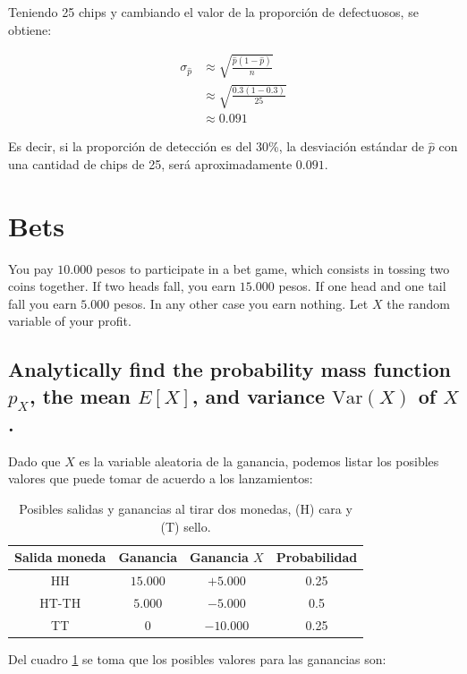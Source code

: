 \documentclass[12pt]{article}\usepackage[]{graphicx}\usepackage[]{xcolor}
\begin{document}
Teniendo 25 chips y cambiando el valor de la proporción de defectuosos, se obtiene:

\begin{align*}
  \sigma_{\hat{p}} &\approx \sqrt{\frac{\hat{p}(1 - \hat{p}) }{n}} \\
                   &\approx   \sqrt{\frac{0.3(1 - 0.3) }{25}} \\
  &\approx 0.091
\end{align*}

Es decir, si la proporción de detección es del 30\%, la desviación estándar de $\hat{p}$ con una cantidad de chips de 25, será aproximadamente $0.091$.

\section{Bets}

You pay $10.000$ pesos to participate in a bet game, which consists in tossing two coins together. If two heads fall, you earn $15.000$ pesos. If one head and one tail fall you earn $5.000$ pesos. In any other case you earn nothing. Let $X$ the random variable of your profit.

\subsection{Analytically find the probability mass function $p_{X}$, the mean $E[X]$, and variance $\mathrm{Var}(X)$ of $X$.}

Dado que $X$ es la variable aleatoria de la ganancia, podemos listar los posibles valores que puede tomar de acuerdo a los lanzamientos:

\begin{table}[ht]
  \centering
  \begin{tabular}[h]{|c|c|c|c|}
    \hline
    \textbf{Salida moneda} & \textbf{Ganancia} & \textbf{Ganancia} $X$ & \textbf{Probabilidad} \\ \hline
    HH & $15.000$ & $+5.000$ & 0.25 \\ \hline
    HT-TH & $5.000$ & $-5.000$ & 0.5 \\ \hline
    TT & $0$ & $-10.000$ & 0.25 \\ \hline 
  \end{tabular}
  \caption{Posibles salidas y ganancias al tirar dos monedas, (H) cara y (T) sello.}
  \label{tab:p3}
\end{table}

Del cuadro \ref{tab:p3} se toma que los posibles valores para las ganancias son:
\end{document}
